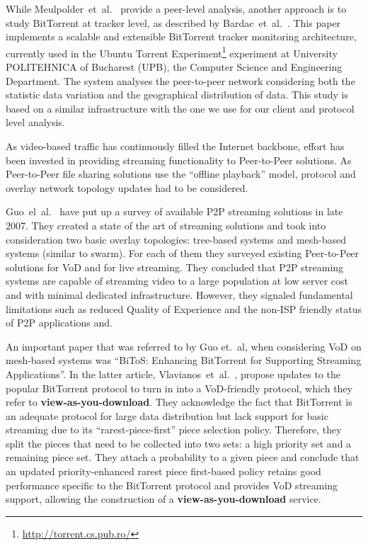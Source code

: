 While Meulpolder~et~al.~\cite{p2p09} provide a peer-level analysis, another
approach is to study BitTorrent at tracker level, as described by
Bardac~et~al.~\cite{tracker-mon}. This paper implements a scalable and
extensible BitTorrent tracker monitoring architecture, currently used in the
Ubuntu Torrent Experiment\footnote{\url{http://torrent.cs.pub.ro/}} experiment
at University POLITEHNICA of Bucharest (UPB), the Computer Science and
Engineering Department. The system analyses the peer-to-peer network
considering both the statistic data variation and the geographical
distribution of data. This study is based on a similar infrastructure with the
one we use for our client and protocol level analysis.

As video-based traffic has continuously filled the Internet backbone, effort
has been invested in providing streaming functionality to Peer-to-Peer
solutions.  As Peer-to-Peer file sharing solutions use the ``offline
playback'' model, protocol and overlay network topology updates had to be
considered.

Guo~el~al.~\cite{p2p-streaming-survey} have put up a survey of available P2P
streaming solutions in late 2007. They created a state of the art of streaming
solutions and took into consideration two basic overlay topologies: tree-based
systems and mesh-based systems (similar to swarm). For each of them they
surveyed existing Peer-to-Peer solutions for VoD and for live streaming. They
concluded that P2P streaming systems are capable of streaming video to a large
population at low server cost and with minimal dedicated infrastructure.
However, they signaled fundamental limitations such as reduced Quality of
Experience and the non-ISP friendly status of P2P applications and.

An important paper that was referred to by Guo et.~al, when considering VoD on
mesh-based systems was ``BiToS: Enhancing BitTorrent for Supporting Streaming
Applications''. In the latter article, Vlavianos~et~al.~\cite{bitos}, propose
updates to the popular BitTorrent protocol to turn in into a VoD-friendly
protocol, which they refer to \textbf{view-as-you-download}. They acknowledge
the fact that BitTorrent is an adequate protocol for large data distribution
but lack support for basic streaming due to its ``rarest-piece-first'' piece
selection policy. Therefore, they split the pieces that need to be collected
into two sets: a high priority set and a remaining piece set. They attach a
probability to a given piece and conclude that an updated priority-enhanced
rarest piece first-based policy retains good performance specific to the
BitTorrent protocol and provides VoD streaming support, allowing the
construction of a \textbf{view-as-you-download} service.

